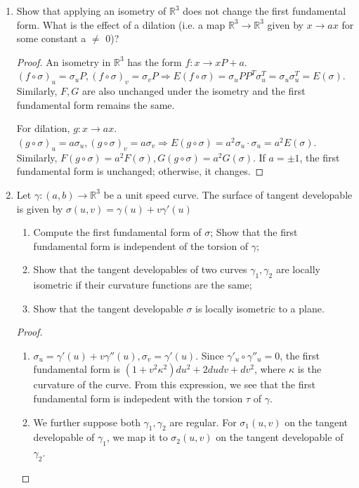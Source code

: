 \documentclass{article}
\begin{document}
\courseheader
{}
\begin{enumerate}
\item Show that applying an isometry of $\mathbb{R}^3$ does not change the first fundamental form. 
What is the effect of a dilation (i.e. a map $\mathbb{R}^3 \to \mathbb{R}^3$ given by $x\to ax$
for some constant a $\neq$ 0)?
\begin{proof}
An isometry in $\mathbb{R}^3$ has the form $f:x\to xP+a$. $(f\circ \sigma)_u =\sigma_u P,(f\circ \sigma)_v =\sigma_v P \Rightarrow 
E(f\circ\sigma) = \sigma_u PP^T\sigma_u^T =\sigma_u \sigma_u^T=E(\sigma)$. Similarly, $F,G$ are also unchanged under the isometry and the first fundamental form remains the same.

For dilation, $g: x\to ax$. $(g\circ \sigma)_u = a \sigma_u, (g\circ \sigma)_v = a \sigma_v \Rightarrow 
E(g\circ \sigma) = a^2 \sigma_u \cdot \sigma_u = a^2 E(\sigma)$.
Similarly, $F(g \circ \sigma) = a^2 F(\sigma), G(g\circ \sigma) = a^2 G(\sigma)$. If $ a = \pm 1$, the first fundamental form is unchanged; otherwise, it changes.
\end{proof}
\item Let $\gamma:(a,b) \to \mathbb{R}^3$ be a unit speed curve. The surface of tangent developable is given by
$\sigma(u,v) = \gamma(u)+v\gamma'(u)$
\begin{enumerate}[label=(\arabic*)]
\item Compute the first fundamental form of $\sigma$; Show that the first fundamental form is independent of the torsion of $\gamma$;
\item Show that the tangent developables of two curves $\gamma_1,\gamma_2$ are locally isometric if their curvature functions are the same;
\item Show that the tangent developable $\sigma$ is locally isometric to a plane.
\end{enumerate}
\begin{proof}\mbox{}
\begin{enumerate}[label=(\arabic*)]
\item $\sigma_u = \gamma'(u)+v\gamma''(u),\sigma_v = \gamma'(u)$. Since $\gamma'_u \circ \gamma''_u =0$, the first fundamental form is $(1+v^2\kappa^2)du^2+2dudv+dv^2$, where $\kappa$ is the curvature of the curve. From this expression, we see that the first fundamental form is indepedent with the torsion $\tau$ of $\gamma$. 
\item We further suppose both $\gamma_1, \gamma_2$ are regular. For $\sigma_1(u,v)$ on the tangent developable of $\gamma_1$, we map it to $\sigma_2(u,v)$ on the tangent developable of $\gamma_2$. 

\end{enumerate}
\end{proof}
\end{enumerate}
\end{document}
